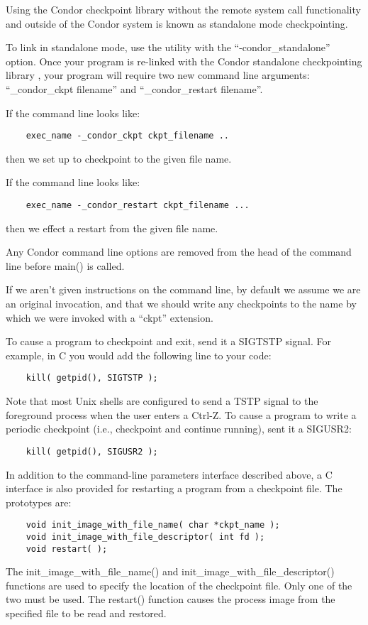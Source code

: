 Using the Condor checkpoint library without the remote system call
functionality and outside of the Condor system is known as standalone
mode checkpointing.

To link in standalone mode, use the 
utility with the ``-condor\_standalone'' option.  Once your program is
re-linked with the Condor standalone checkpointing library
, your program will require two new command line
arguments: ``\_condor\_ckpt filename'' and ``\_condor\_restart
filename''.

If the command line looks like:

\begin{verbatim}
	exec_name -_condor_ckpt ckpt_filename ..
\end{verbatim}

then we set up to checkpoint to the given file name.

If the command line looks like:

\begin{verbatim}
	exec_name -_condor_restart ckpt_filename ...
\end{verbatim}

then we effect a restart from the given file name.

Any Condor command line options are removed from the head of the
command line before main() is called.

If we aren't given instructions on the command line, by default we
assume we are an original invocation, and that we should write any
checkpoints to the name by which we were invoked with a
``ckpt'' extension.

To cause a program to checkpoint and exit, send it a SIGTSTP signal.  For 
example, in C you would add the following line to your code:

\begin{verbatim}
	kill( getpid(), SIGTSTP );
\end{verbatim}

Note that most Unix shells are configured to send a TSTP signal to the
foreground process when the user enters a Ctrl-Z.  To cause a program
to write a periodic checkpoint (i.e., checkpoint and continue
running), sent it a SIGUSR2:

\begin{verbatim}
	kill( getpid(), SIGUSR2 );
\end{verbatim}

In addition to the command-line parameters interface described above,
a C interface is also provided for restarting a program from a
checkpoint file.  The prototypes are:

\begin{verbatim}
	void init_image_with_file_name( char *ckpt_name );
	void init_image_with_file_descriptor( int fd );
	void restart( );
\end{verbatim}

The init\_image\_with\_file\_name() and
init\_image\_with\_file\_descriptor() functions are used to specify
the location of the checkpoint file.  Only one of the two must be
used.  The restart() function causes the process image from the
specified file to be read and restored.
